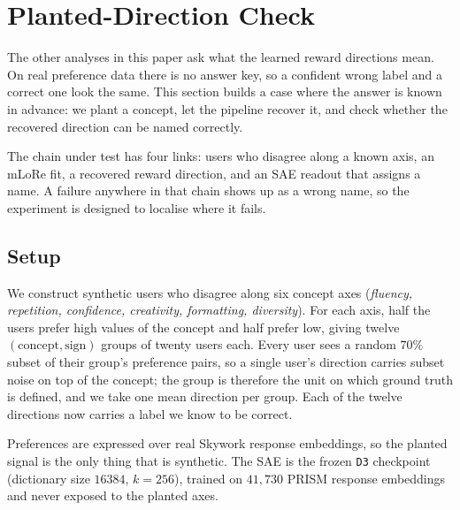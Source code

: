 
\section{Planted-Direction Check}
\label{sec:planted}

The other analyses in this paper ask what the learned reward directions mean.
On real preference data there is no answer key, so a confident wrong label and a
correct one look the same. This section builds a case where the answer is known
in advance: we plant a concept, let the pipeline recover it, and check whether
the recovered direction can be named correctly.

The chain under test has four links: users who disagree along a known axis, an
mLoRe fit, a recovered reward direction, and an SAE readout that assigns a name.
A failure anywhere in that chain shows up as a wrong name, so the experiment is
designed to localise where it fails.

\subsection{Setup}

We construct synthetic users who disagree along six concept axes (\emph{fluency,
repetition, confidence, creativity, formatting, diversity}). For each axis, half
the users prefer high values of the concept and half prefer low, giving twelve
$(\text{concept},\text{sign})$ groups of twenty users each. Every user sees a
random $70\%$ subset of their group's preference pairs, so a single user's
direction carries subset noise on top of the concept; the group is therefore the
unit on which ground truth is defined, and we take one mean direction per group.
Each of the twelve directions now carries a label we know to be correct.

Preferences are expressed over real Skywork response embeddings, so the planted
signal is the only thing that is synthetic. The SAE is the frozen \texttt{D3}
checkpoint (dictionary size $16384$, $k=256$), trained on $41{,}730$ PRISM
response embeddings and never exposed to the planted axes.

